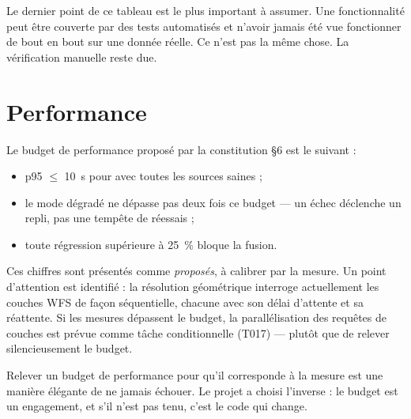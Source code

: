 \begin{honesty}
Le dernier point de ce tableau est le plus important à assumer. Une
fonctionnalité peut être couverte par des tests automatisés et n'avoir jamais
été vue fonctionner de bout en bout sur une donnée réelle. Ce n'est pas la même
chose. La vérification manuelle reste due.
\end{honesty}

\section{Performance}

Le budget de performance proposé par la constitution §6 est le suivant :

\begin{itemize}[leftmargin=1.4em]
  \item p95 $\leq$ 10~s pour  avec toutes les
        sources saines ;
  \item le mode dégradé ne dépasse pas deux fois ce budget — un échec déclenche
        un repli, pas une tempête de réessais ;
  \item toute régression supérieure à 25~\% bloque la fusion.
\end{itemize}

Ces chiffres sont présentés comme \emph{proposés}, à calibrer par la mesure.
Un point d'attention est identifié : la résolution géométrique interroge
actuellement les couches WFS de façon séquentielle, chacune avec son délai
d'attente et sa réattente. Si les mesures dépassent le budget, la parallélisation
des requêtes de couches est prévue comme tâche conditionnelle (T017) — plutôt
que de relever silencieusement le budget.

\begin{honesty}
Relever un budget de performance pour qu'il corresponde à la mesure est une
manière élégante de ne jamais échouer. Le projet a choisi l'inverse : le budget
est un engagement, et s'il n'est pas tenu, c'est le code qui change.
\end{honesty}
